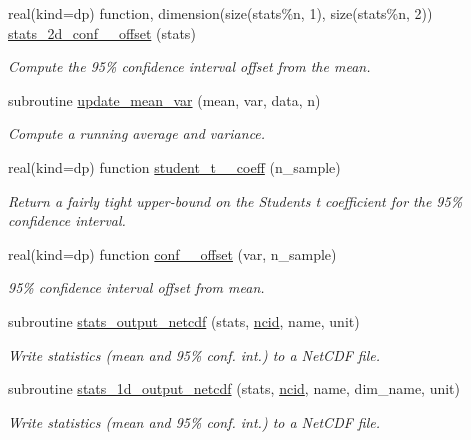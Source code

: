 \begin{DoxyCompactItemize}
real(kind=dp) function, dimension(size(stats\%n, 1), size(stats\%n, 2)) \mbox{\hyperlink{namespacepmc__stats_a4b54545fdbc6ea7302c947217f65a3cf}{stats\+\_\+2d\+\_\+conf\+\_\+\_\+offset}} (stats)
\begin{DoxyCompactList}\small\item\em Compute the 95\% confidence interval offset from the mean. \end{DoxyCompactList}\item 
subroutine \mbox{\hyperlink{namespacepmc__stats_a03fc23e0f58ef39a98b3fab675f7ec2f}{update\+\_\+mean\+\_\+var}} (mean, var, data, n)
\begin{DoxyCompactList}\small\item\em Compute a running average and variance. \end{DoxyCompactList}\item 
real(kind=dp) function \mbox{\hyperlink{namespacepmc__stats_a60b9373973781e467921c5e7558a57f9}{student\+\_\+t\+\_\+\_\+coeff}} (n\+\_\+sample)
\begin{DoxyCompactList}\small\item\em Return a fairly tight upper-\/bound on the Student\textquotesingle{}s t coefficient for the 95\% confidence interval. \end{DoxyCompactList}\item 
real(kind=dp) function \mbox{\hyperlink{namespacepmc__stats_a4ef20f4ac022e62933d3ed80e4041b88}{conf\+\_\+\_\+offset}} (var, n\+\_\+sample)
\begin{DoxyCompactList}\small\item\em 95\% confidence interval offset from mean. \end{DoxyCompactList}\item 
subroutine \mbox{\hyperlink{namespacepmc__stats_a7bd7c2f154323bb763f7bfa0f6e6f9a1}{stats\+\_\+output\+\_\+netcdf}} (stats, \mbox{\hyperlink{fractal_8_f90_a4e89f3f850921ff84a6dfce8b166ad50}{ncid}}, name, unit)
\begin{DoxyCompactList}\small\item\em Write statistics (mean and 95\% conf. int.) to a Net\+C\+DF file. \end{DoxyCompactList}\item 
subroutine \mbox{\hyperlink{namespacepmc__stats_a644ef48950c748f3ab3a3d9276186c21}{stats\+\_\+1d\+\_\+output\+\_\+netcdf}} (stats, \mbox{\hyperlink{fractal_8_f90_a4e89f3f850921ff84a6dfce8b166ad50}{ncid}}, name, dim\+\_\+name, unit)
\begin{DoxyCompactList}\small\item\em Write statistics (mean and 95\% conf. int.) to a Net\+C\+DF file. \end{DoxyCompactList}\item 

\end{DoxyCompactItemize}
